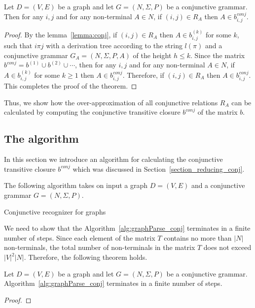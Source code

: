 \begin{mytheorem}\label{thm:correct_conj}
 Let $D = (V,E)$ be a graph and let $G =(N,\Sigma,P)$ be a conjunctive grammar. Then for any $i, j$ and for any non-terminal $A \in N$, if $(i,j) \in R_A$ then $A \in b^{conj}_{i,j}$.
\end{mytheorem}
\begin{proof}

By the lemma~\ref{lemma:conj}, if $(i,j) \in R_A$ then $A \in b^{(k)}_{i,j}$ for some $k$, such that $i \pi j$ with a derivation tree according to the string $l(\pi)$ and a conjunctive grammar $G_A = (N,\Sigma,P,A)$ of the height $h \leq k$. Since the matrix $b^{conj} = b^{(1)} \cup b^{(2)} \cup \cdots$, then for any $i, j$ and for any non-terminal $A \in N$, if $A \in b^{(k)}_{i,j}$ for some $k \geq 1$ then  $A \in b^{conj}_{i,j}$. Therefore, if $(i,j) \in R_A$ then $A \in b^{conj}_{i,j}$. This completes the proof of the theorem.
\end{proof}

Thus, we show how the over-approximation of all conjunctive relations $R_A$ can be calculated by computing the conjunctive transitive closure $b^{conj}$ of the matrix $b$.



\subsection{The algorithm} \label{section_algorithm_conj}
In this section we introduce an algorithm for calculating the conjunctive transitive closure $b^{conj}$ which was discussed in Section~\ref{section_reducing_conj}.

The following algorithm takes on input a graph $D = (V, E)$ and a conjunctive grammar $G = (N,\Sigma,P)$.

\begin{algorithm}[H]
\begin{algorithmic}[1]
\caption{Conjunctive recognizer for graphs}
\label{alg:graphParse_conj}
   
\EndFunction
\end{algorithmic}
\end{algorithm}

We need to show that the Algorithm~\ref{alg:graphParse_conj} terminates in a finite number of steps. Since each element of the matrix $T$ contains no more than $|N|$ non-terminals, the total number of non-terminals in the matrix $T$ does not exceed $|V|^2|N|$. Therefore, the following theorem holds.

\begin{mytheorem}\label{thm:finite_conj}
 Let $D = (V,E)$ be a graph and let $G =(N,\Sigma,P)$ be a conjunctive grammar. Algorithm~\ref{alg:graphParse_conj} terminates in a finite number of steps. 
\end{mytheorem}
\begin{proof}
\end{proof}
